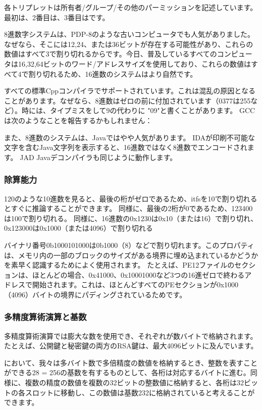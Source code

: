 各トリプレットは所有者/グループ/その他のパーミッションを記述しています。最初は、2番目は、3番目はです。

8進数字システムは、PDP-8のような古いコンピュータでも人気がありました。なぜなら、そこには12,24、または36ビットが存在する可能性があり、これらの数値はすべて3で割り切れるからです。今日、普及しているすべてのコンピュータは16,32,64ビットのワード/アドレスサイズを使用しており、これらの数値はすべて4で割り切れるため、16進数のシステムはより自然です。

すべての標準Cppコンパイラでサポートされています。これは混乱の原因となることがあります。なぜなら、8進数はゼロの前に付加されています（0377は255など）。時には、タイプミスをして9の代わりに "09"と書くことがあります。 GCCは次のようなことを報告するかもしれません：

また、8進数のシステムは、Javaではやや人気があります。 IDAが印刷不可能な文字を含むJava文字列を表示すると、16進数ではなく8進数でエンコードされます。 
JAD Javaデコンパイラも同じように動作します。

\subsubsection{除算能力}

120のような10進数を見ると、最後の桁がゼロであるため、itfsを10で割り切れるとすぐに推論することができます。 同様に、最後の2桁が0であるため、123400は100で割り切れる。 同様に、16進数の0x1230は0x10（または16）で割り切れ、0x123000は0x1000（または4096）で割り切れる

バイナリ番号0b1000101000は0b1000（8）などで割り切れます。このプロパティは、メモリ内の一部のブロックのサイズがある境界に埋め込まれているかどうかを素早く認識するためによく使用されます。 たとえば、PE12ファイルのセクションは、ほとんどの場合、0x41000、0x10001000など3つの16進ゼロで終わるアドレスで開始されます。これは、ほとんどすべての\ac{PE}セクションが0x1000（4096）バイトの境界にパディングされているためです。

\subsubsection{多精度算術演算と基数}

多精度算術演算では膨大な数を使用でき、それぞれが数バイトで格納されます。
たとえば、公開鍵と秘密鍵の両方のRSA鍵は、最大4096ビットに及んでいます。

において、我々は多バイト数で多倍精度の数値を格納するとき、整数を表すことができる28 = 256の基数を有するものとして、各桁は対応するバイトに進む。同様に、複数の精度の数値を複数の32ビットの整数値に格納すると、各桁は32ビットの各スロットに移動し、この数値は基数232に格納されていると考えることができます。

